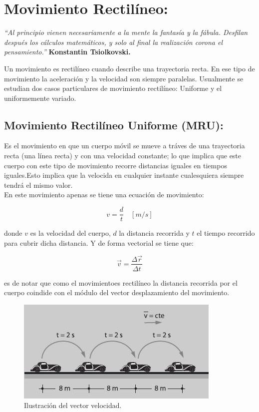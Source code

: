 \chapter{Movimiento Rectilíneo:}

\textit{``Al principio vienen necesariamente a la mente la fantasía y la fábula. Desfilan después los cálculos matemáticos, y 
solo 
al final la realización corona el pensamiento.''} \textbf{Konstantin Tsiolkovski.} 
\vspace{1.0 cm}

Un movimiento es rectilíneo cuando describe una trayectoria recta. En ese tipo de movimiento la aceleración y la velocidad son 
siempre paralelas. Usualmente se estudian dos casos particulares de movimiento rectilíneo: Uniforme y el uniformemente variado.

\section{Movimiento Rectilíneo Uniforme (MRU):}
 
Es el movimiento en que un cuerpo móvil se mueve a tráves de una trayectoria recta (una línea recta) y con una velocidad 
constante; lo que implica que este cuerpo con este tipo de movimiento recorre distancias iguales en tiempos iguales.Esto implica 
que la velocida en cualquier instante cualesquiera siempre
 tendrá el mismo valor.\\

En este movimiento apenas se tiene una ecuación de movimiento:

\begin{equation}
 v = \frac{d}{t}\quad [m/s]
\end{equation}

donde $v$ es la velocidad del cuerpo, $d$ la distancia recorrida y $t$ el tiempo recorrido para cubrir dicha distancia. Y de 
forma vectorial se tiene que:

\begin{equation}
 \vec{v} = \frac{\Delta\vec{r}}{\Delta t}
\end{equation}

es de notar que como el movimientoes rectilíneo la distancia recorrida por el cuerpo coindide con el módulo del vector 
desplazamiento del movimiento.\\
 
\begin{figure}[ht]
 \centering
 \includegraphics[scale=0.8]{images/Movimiento_rectilineo_uniforme.jpg}
 \caption{Ilustración del vector velocidad.}\label{mru}
\end{figure} 
 
